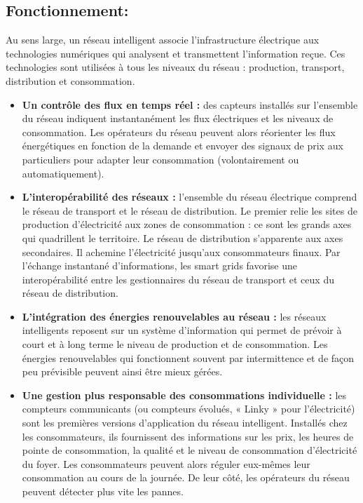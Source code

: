\subsection{Fonctionnement:}
Au sens large, un réseau intelligent associe l’infrastructure électrique aux technologies numériques qui analysent et transmettent l’information reçue. Ces technologies sont utilisées à tous les niveaux du réseau : production, transport, distribution et consommation.

\begin{itemize}[label=\textbullet]
\item \textbf{Un contrôle des flux en temps réel :} des capteurs installés sur l’ensemble du réseau indiquent instantanément les flux électriques et les niveaux de consommation. Les opérateurs du réseau peuvent alors réorienter les flux énergétiques en fonction de la demande et envoyer des signaux de prix aux particuliers pour adapter leur consommation (volontairement ou automatiquement).

\item \textbf{L’interopérabilité des réseaux :} l’ensemble du réseau électrique comprend le réseau de transport et le réseau de distribution. Le premier relie les sites de production d’électricité aux zones de consommation : ce sont les grands axes qui quadrillent le territoire. Le réseau de distribution s’apparente aux axes secondaires. Il achemine l’électricité jusqu’aux consommateurs finaux. Par l’échange instantané d’informations, les smart grids favorise une interopérabilité entre les gestionnaires du réseau de transport et ceux du réseau de distribution.

\item \textbf{L’intégration des énergies renouvelables au réseau :} les réseaux intelligents reposent sur un système d’information qui permet de prévoir à court et à long terme le niveau de production et de consommation. Les énergies renouvelables qui fonctionnent souvent par intermittence et de façon peu prévisible peuvent ainsi être mieux gérées.

\item \textbf{Une gestion plus responsable des consommations individuelle :} les compteurs communicants (ou compteurs évolués, « Linky » pour l'électricité) sont les premières versions d’application du réseau intelligent. Installés chez les consommateurs, ils fournissent des informations sur les prix, les heures de pointe de consommation, la qualité et le niveau de consommation d’électricité du foyer. Les consommateurs peuvent alors réguler eux-mêmes leur consommation au cours de la journée. De leur côté, les opérateurs du réseau peuvent détecter plus vite les pannes.
\end{itemize}

